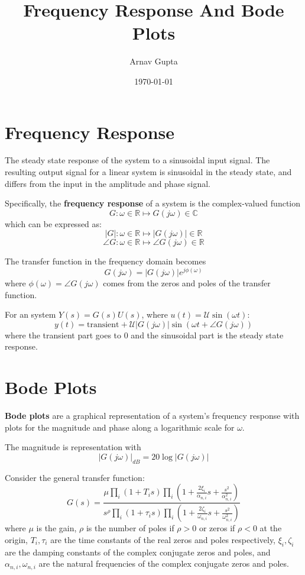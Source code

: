 \documentclass[11pt]{article}
\author{Arnav Gupta}
\date{\today}
\title{Frequency Response And Bode Plots}
\begin{document}
\maketitle
\tableofcontents

\section{Frequency Response}
\label{sec:orgd248e28}
The steady state response of the system to a sinusoidal input signal.
The resulting output signal for a linear system is sinusoidal in the steady
state, and differs from the input in the amplitude and phase signal.

Specifically, the \textbf{frequency response} of a system is the complex-valued function
$$
G : \omega \in \mathbb{R} \mapsto G(j\omega) \in \mathbb{C}
$$
which can be expressed as:
$$ |G| : \omega \in \mathbb{R} \mapsto |G(j\omega)| \in \mathbb{R} $$
$$ \angle G : \omega \in \mathbb{R} \mapsto \angle G(j\omega) \in \mathbb{R} $$

The transfer function in the frequency domain becomes
$$ G(j \omega) = |G(j \omega)| e^{j \phi(\omega)} $$
where \(\phi(\omega) = \angle G(j\omega)\) comes from the zeros and poles of the transfer function.

For an system \(Y(s) = G(s) U(s)\), where \(u(t) = \mathcal{U} \sin(\omega t)\):
$$ y(t) = \text{transient} + \mathcal{U} |G(j \omega)| \sin(\omega t + \angle G(j \omega)) $$
where the transient part goes to 0 and the sinusoidal part is the steady state response.
\section{Bode Plots}
\label{sec:org1017130}
\textbf{Bode plots} are a graphical representation of a system's frequency response with plots for the
magnitude and phase along a logarithmic scale for \(\omega\).

The magnitude is representation with
$$ |G(j \omega)|_{dB} = 20 \log |G(j \omega)| $$

Consider the general transfer function:
$$
G(s) = \frac{\mu \prod_{i} ( 1 + T_{i}s ) \prod_{i} \left( 1 + \frac{2 \xi_{i}}{\alpha_{n, i}}s + \frac{s^{2}}{\alpha^{2}_{n,i}} \right)}{s^{\rho} \prod_{i} (1 + \tau_{i} s) \prod_{i} \left( 1 + \frac{2\zeta_{i}}{\omega_{n, i}}s + \frac{s^{2}}{\omega^{2}_{n, i}} \right)}
$$
where \(\mu\) is the gain, \(\rho\) is the number of poles if \(\rho > 0\) or zeros if \(\rho < 0\) at the origin,
\(T_{i},\tau_{i}\) are the time constants of the real zeros and poles respectively,
\(\xi_{i}, \zeta_{i}\) are the damping constants of the complex conjugate zeros and poles,
and \(\alpha_{n, i}, \omega_{n, i}\) are the natural frequencies of the complex conjugate zeros and poles.
\end{document}

